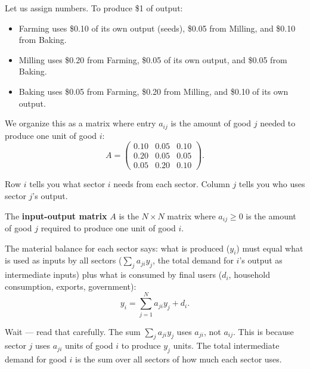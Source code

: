 \documentclass[../structural_economics_book.tex]{subfiles}
\begin{document}
\begin{example}\label{ch01:ex:IO}
Let us assign numbers. To produce \$1 of output:
\begin{itemize}
\item Farming uses \$0.10 of its own output (seeds), \$0.05 from Milling, and \$0.10 from Baking.
\item Milling uses \$0.20 from Farming, \$0.05 of its own output, and \$0.05 from Baking.
\item Baking uses \$0.05 from Farming, \$0.20 from Milling, and \$0.10 of its own output.
\end{itemize}

We organize this as a matrix where entry $a_{ij}$ is the amount of good $j$ needed to produce one unit of good $i$:
\begin{equation}\label{ch01:eq:A_example}
A = \begin{pmatrix} 0.10 & 0.05 & 0.10 \\ 0.20 & 0.05 & 0.05 \\ 0.05 & 0.20 & 0.10 \end{pmatrix}.
\end{equation}

Row $i$ tells you what sector $i$ needs from each sector. Column $j$ tells you who uses sector $j$'s output.
\end{example}

\begin{definition}\label{ch01:def:IO}
The \textbf{input-output matrix} $A$ is the $N \times N$ matrix where $a_{ij} \geq 0$ is the amount of good $j$ required to produce one unit of good $i$.
\end{definition}

The material balance for each sector says: what is produced ($y_i$) must equal what is used as inputs by all sectors ($\sum_j a_{ji} y_j$, the total demand for $i$'s output as intermediate inputs) plus what is consumed by final users ($d_i$, household consumption, exports, government):
\begin{equation}
y_i = \sum_{j=1}^N a_{ji} y_j + d_i.
\end{equation}

Wait --- read that carefully. The sum $\sum_j a_{ji} y_j$ uses $a_{ji}$, not $a_{ij}$. This is because sector $j$ uses $a_{ji}$ units of good $i$ to produce $y_j$ units. The total intermediate demand for good $i$ is the sum over all sectors of how much each sector uses.
\end{document}
